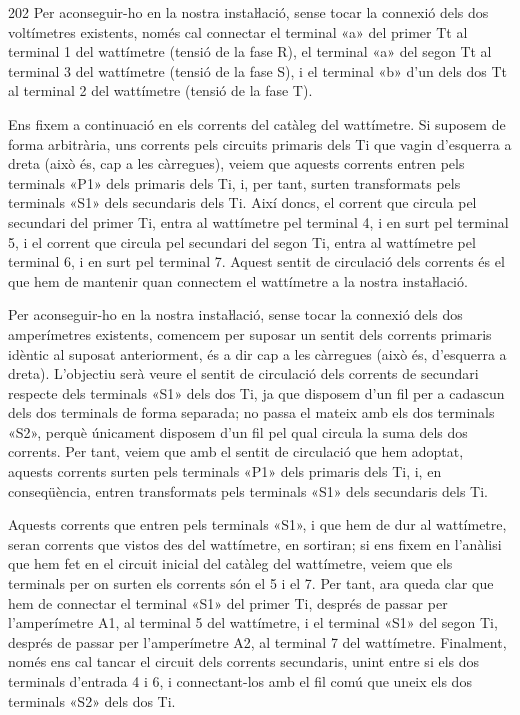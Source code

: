 \begin{exemple}[\ConnexWatt{}]
\begin{dingautolist}{202}
    Per aconseguir-ho en la nostra instaŀlació, sense tocar la
    connexió dels dos voltímetres existents, només cal connectar
    el terminal «\textsf{a}» del primer Tt al terminal 1 del wattímetre (tensió de
    la fase R), el terminal «\textsf{a}» del segon Tt al terminal 3 del wattímetre
    (tensió de la fase S), i el terminal «\textsf{b}» d'un dels dos Tt
    al terminal 2 del wattímetre (tensió de la fase T).

    \item Ens fixem a continuació en els corrents del catàleg del  wattímetre. Si suposem
    de forma arbitrària, uns corrents pels circuits primaris dels Ti
    que vagin d'esquerra a dreta (això és, cap a les càrregues), veiem
    que aquests corrents entren pels terminals «\textsf{P1}» dels primaris dels Ti,
    i, per tant, surten transformats pels terminals «\textsf{S1}» dels secundaris
    dels Ti. Així doncs, el corrent que circula pel secundari del primer
    Ti, entra al wattímetre pel terminal 4, i en surt pel terminal 5, i
    el corrent que circula pel secundari del segon Ti, entra al
    wattímetre pel terminal 6, i en surt pel terminal 7. Aquest sentit
    de circulació dels corrents és el que hem de mantenir quan
    connectem el wattímetre a la nostra instaŀlació.

    Per aconseguir-ho en la nostra instaŀlació, sense tocar la
    connexió dels dos amperímetres existents, comencem per suposar un
    sentit dels corrents primaris idèntic al suposat anteriorment, és a
    dir cap a les càrregues (això és, d'esquerra a dreta). L'objectiu
    serà veure el sentit de circulació dels corrents de secundari
    respecte dels terminals «\textsf{S1}» dels dos Ti, ja que disposem d'un fil per
    a cadascun dels dos terminals de forma separada; no passa el mateix
    amb els dos terminals «\textsf{S2}», perquè únicament disposem d'un fil pel
    qual circula la suma dels dos corrents. Per tant, veiem que amb el
    sentit de circulació que hem adoptat, aquests corrents surten pels
    terminals «\textsf{P1}» dels primaris dels Ti, i, en conseqüència, entren transformats
    pels terminals «\textsf{S1}» dels secundaris dels Ti.

    Aquests corrents que entren pels terminals «\textsf{S1}», i que hem de dur al
    wattímetre, seran corrents que vistos des del wattímetre, en
    sortiran; si ens fixem en l'anàlisi que hem fet en el
    circuit inicial del catàleg del wattímetre, veiem que els terminals per on surten
    els corrents són el 5 i el 7. Per tant, ara queda clar que hem de
    connectar el terminal «\textsf{S1}» del primer Ti, després de passar per
    l'amperímetre \textsf{A1}, al terminal 5 del wattímetre, i el
    terminal «\textsf{S1}» del segon Ti, després de passar per l'amperímetre
    \textsf{A2}, al terminal 7 del wattímetre. Finalment, només ens cal
    tancar el circuit dels corrents secundaris, unint entre si els dos
    terminals d'entrada 4  i 6, i connectant-los amb el fil comú que
    uneix els dos terminals «\textsf{S2}» dels dos Ti.


\end{dingautolist}
\end{exemple}
